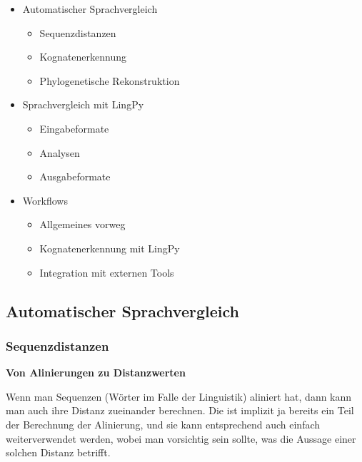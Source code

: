\begin{itemize}
\itemsep1pt\parskip0pt
\item
  {Automatischer Sprachvergleich}

  \begin{itemize}
  \itemsep1pt\parskip0pt
  \item
    {Sequenzdistanzen}
  \item
    {Kognatenerkennung}
  \item
    {Phylogenetische Rekonstruktion}
  \end{itemize}
\item
  {Sprachvergleich mit LingPy}

  \begin{itemize}
  \itemsep1pt\parskip0pt
  \item
    {Eingabeformate}
  \item
    {Analysen}
  \item
    {Ausgabeformate}
  \end{itemize}
\item
  {Workflows}

  \begin{itemize}
  \itemsep1pt\parskip0pt
  \item
    {Allgemeines vorweg}
  \item
    {Kognatenerkennung mit LingPy}
  \item
    {Integration mit externen Tools}
  \end{itemize}
\end{itemize}

\subsection{\texorpdfstring{{Automatischer
Sprachvergleich}}{Automatischer Sprachvergleich}}

\subsubsection{\texorpdfstring{{Sequenzdistanzen}}{Sequenzdistanzen}}

\textbf{Von Alinierungen zu Distanzwerten}

Wenn man Sequenzen (Wörter im Falle der Linguistik) aliniert hat, dann
kann man auch ihre Distanz zueinander berechnen. Die ist implizit ja
bereits ein Teil der Berechnung der Alinierung, und sie kann
entsprechend auch einfach weiterverwendet werden, wobei man vorsichtig
sein sollte, was die Aussage einer solchen Distanz betrifft.

